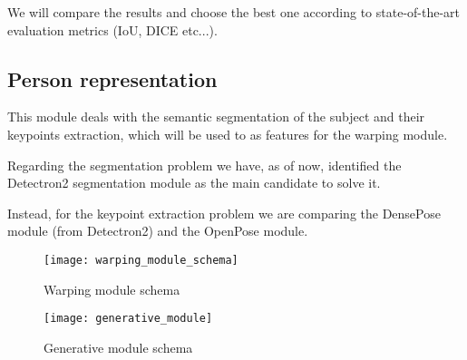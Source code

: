 \begin{multicols}{2}
We will compare the results and choose the best one according to state-of-the-art evaluation metrics (IoU, DICE etc...).



\subsection{Person representation}
This module deals with the semantic segmentation of the subject and their keypoints extraction, which will be used to as features for the warping module.

Regarding the segmentation problem we have, as of now, identified the Detectron2 segmentation module as the main candidate to solve it.

Instead, for the keypoint extraction problem we are comparing the DensePose module (from Detectron2) and the OpenPose module.

\end{multicols}

\begin{figure*}[h]
\centering
\texttt{[image: warping\_module\_schema]}
\caption{Warping module schema}
\label{fig:warp_schema}
\end{figure*}

\begin{figure*}[h]
\centering
\texttt{[image: generative\_module]}
\caption{Generative module schema}
\label{fig:gen_schema}
\end{figure*}

